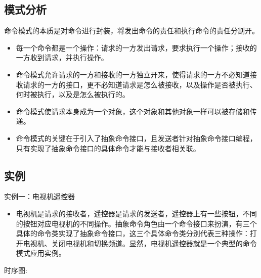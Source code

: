 \documentclass[letterpaper,10pt,english]{sphinxmanual}
\begin{document}
\subsection{模式分析}
\label{\detokenize{behavioral_patterns/command:id8}}
\sphinxAtStartPar
命令模式的本质是对命令进行封装，将发出命令的责任和执行命令的责任分割开。
\begin{itemize}
\item {} 
\sphinxAtStartPar
每一个命令都是一个操作：请求的一方发出请求，要求执行一个操作；接收的一方收到请求，并执行操作。

\item {} 
\sphinxAtStartPar
命令模式允许请求的一方和接收的一方独立开来，使得请求的一方不必知道接收请求的一方的接口，更不必知道请求是怎么被接收，以及操作是否被执行、何时被执行，以及是怎么被执行的。

\item {} 
\sphinxAtStartPar
命令模式使请求本身成为一个对象，这个对象和其他对象一样可以被存储和传递。

\item {} 
\sphinxAtStartPar
命令模式的关键在于引入了抽象命令接口，且发送者针对抽象命令接口编程，只有实现了抽象命令接口的具体命令才能与接收者相关联。

\end{itemize}


\subsection{实例}
\label{\detokenize{behavioral_patterns/command:id9}}
\sphinxAtStartPar
实例一：电视机遥控器
\begin{itemize}
\item {} 
\sphinxAtStartPar
电视机是请求的接收者，遥控器是请求的发送者，遥控器上有一些按钮，不同的按钮对应电视机的不同操作。抽象命令角色由一个命令接口来扮演，有三个具体的命令类实现了抽象命令接口，这三个具体命令类分别代表三种操作：打开电视机、关闭电视机和切换频道。显然，电视机遥控器就是一个典型的命令模式应用实例。

\end{itemize}

\noindent{}

\sphinxAtStartPar
时序图:

\noindent{}
\end{document}
